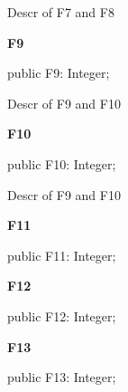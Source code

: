 \documentclass{report}
\newif\ifpdf
\begin{document}
\begin{list}{}
\par Descr of F7 and F8\label{ok_multiple_fields.TRec2-F9}
\item[\textbf{F9}\hfill]
\ifpdf
\begin{flushleft}
\fi
\begin{ttfamily}
public F9: Integer;\end{ttfamily}

\ifpdf
\end{flushleft}
\fi


\par Descr of F9 and F10\label{ok_multiple_fields.TRec2-F10}
\item[\textbf{F10}\hfill]
\ifpdf
\begin{flushleft}
\fi
\begin{ttfamily}
public F10: Integer;\end{ttfamily}

\ifpdf
\end{flushleft}
\fi


\par Descr of F9 and F10\label{ok_multiple_fields.TRec2-F11}
\item[\textbf{F11}\hfill]
\ifpdf
\begin{flushleft}
\fi
\begin{ttfamily}
public F11: Integer;\end{ttfamily}

\ifpdf
\end{flushleft}
\fi


\par  \label{ok_multiple_fields.TRec2-F12}
\item[\textbf{F12}\hfill]
\ifpdf
\begin{flushleft}
\fi
\begin{ttfamily}
public F12: Integer;\end{ttfamily}

\ifpdf
\end{flushleft}
\fi


\par  \label{ok_multiple_fields.TRec2-F13}
\item[\textbf{F13}\hfill]
\ifpdf
\begin{flushleft}
\fi
\begin{ttfamily}
public F13: Integer;\end{ttfamily}

\ifpdf
\end{flushleft}
\fi



\end{list}
\end{document}
